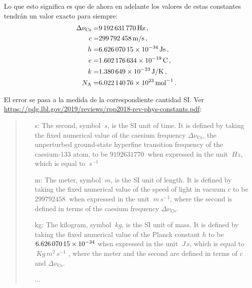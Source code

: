 \begin{frame}
Lo que esto significa es que de ahora en adelante los valores de estas constantes tendrán un valor exacto para siempre:
\begin{align*}
    \Delta\nu_{\text{Cs}}=& \SI{9 192 631 770}{Hz}\,,\\
    c=&\SI{ 299 792 458 }{m/s}\,,\\
    h=&\SI{ 6.62607015E-34 }{J s}\,,\\
     e=&\SI{1.602 176 634E-19}{C}\,,\\
     k=&\SI{1.380 649E-23}{J/K}\,,\\ 
     N_{\text{A}}=&\SI{6.022 140 76E23}{mol^{-1}}\,.  
\end{align*}

El error se pasa a la medida de la correspondiente cantidad SI. Ver \url{https://pdg.lbl.gov/2019/reviews/rpp2018-rev-phys-constants.pdf}:
\begin{quote}
  \begin{itemize}
  \item[s:]  The second, symbol $\SI{}{s}$, is the SI unit of time. It is defined by taking the fixed numerical value of the caesium frequency $\Delta\nu_{\text{Cs}}$, the unperturbed ground-state hyperfine transition frequency of the caesium-133 atom, to be $\SI{9 192 631 770}{}$ when expressed in the unit $\SI{}{Hz}$, which is equal to $\SI{}{s}^{-1}$
  \item[m:] The meter, symbol $\SI{}{m}$, is the SI unit of length. It is defined by taking the fixed numerical value of the speed of light in vacuum $c$  to be $\SI{ 299 792 458 }{}$  when expressed in the unit $\SI{}{m\,s^{-1}}$, where the second is defined in terms of the caesium frequency $\Delta\nu_{\text{Cs}}$.
  \item[kg:] The kilogram, symbol $\SI{}{kg}$, is the SI unit of mass. It is defined by taking the fixed numerical value of the Planck constant $h$ to be $\SI{ 6.62607015E-34 }{}$ when expressed in the unit $\SI{}{J\,s}$, which is equal to $\SI{}{Kg\, m^2\,s^{-1}}$ , where the meter and the second are defined in terms of $c$ and $\Delta\nu_{\text{Cs}}$.
  \item[...]
  \end{itemize}
\end{quote}





\end{frame}



